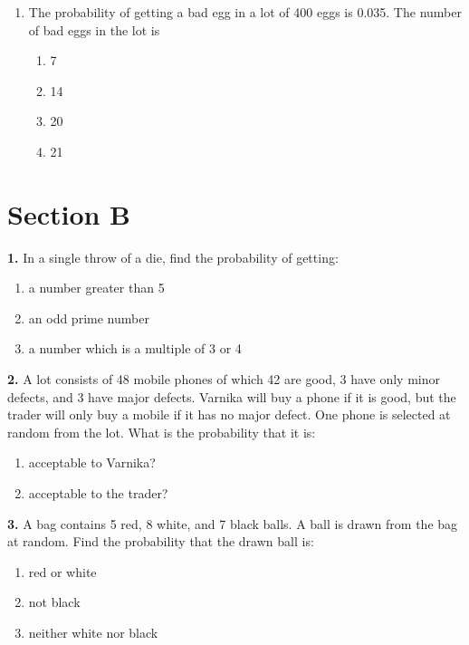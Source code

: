 \documentclass[a4paper, 12pt]{article}
\begin{document}
\begin{multicols}{2}
\begin{enumerate}
		\item The probability of getting a bad egg in a lot of 400 eggs is 0.035. The number of bad eggs in the lot is
		\begin{enumerate}
			\item 7
			\item 14
			\item 20
			\item 21
		\end{enumerate}
		
	\end{enumerate}
	
	
	
	
	
	
	
	

	
	\section*{Section B}

	

	
	\textbf{1.} In a single throw of a die, find the probability of getting:
	\begin{enumerate}
		\item a number greater than 5
		\item an odd prime number
		\item a number which is a multiple of 3 or 4
	\end{enumerate}
	
	\textbf{2.} A lot consists of 48 mobile phones of which 42 are good, 3 have only minor defects, and 3 have major defects. Varnika will buy a phone if it is good, but the trader will only buy a mobile if it has no major defect. One phone is selected at random from the lot. What is the probability that it is:
	\begin{enumerate}
		\item acceptable to Varnika?
		\item acceptable to the trader?
	\end{enumerate}
	
	\textbf{3.} A bag contains 5 red, 8 white, and 7 black balls. A ball is drawn from the bag at random. Find the probability that the drawn ball is:
	\begin{enumerate}
		\item red or white
		\item not black
		\item neither white nor black
	\end{enumerate}
	

\end{multicols}
\end{document}
